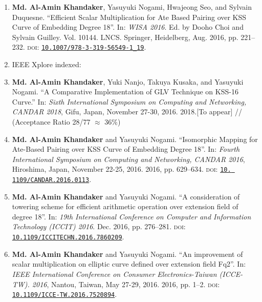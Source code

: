 \begin{enumerate}
	\item \textbf{Md. Al-Amin Khandaker}, Yasuyuki Nogami, Hwajeong Seo, and Sylvain Duquesne. ``Efficient Scalar Multiplication for Ate Based Pairing over KSS Curve of Embedding Degree 18''. In: \textit{WISA 2016}. Ed. by Dooho Choi and Sylvain Guilley. Vol. 10144. LNCS. Springer, Heidelberg, Aug. 2016, pp. 221–232. \textsc{doi}: \href{https://doi.org/10.1007/978-3-319-56549-1\_19}{\texttt{10.1007/978-3-319-56549-1\_19}}.

	\vspace{5mm}
	\clearpage
	\item[ ] \Large IEEE Xplore indexed:
	\normalsize
	\item \textbf{Md. Al-Amin Khandaker}, Yuki Nanjo, Takuya Kusaka, and Yasuyuki Nogami. ``A Comparative Implementation of GLV Technique on KSS-16 Curve.'' In:  \textit{Sixth International Symposium on Computing and Networking, CANDAR 2018}, Gifu, Japan, November 27-30, 2016. 2018.[To appear]
	// (Acceptance Ratio 28/77 $\approx$ 36\%)
	
	\item \textbf{Md. Al-Amin Khandaker} and Yasuyuki Nogami. “Isomorphic Mapping for Ate-Based Pairing over KSS Curve of Embedding Degree 18”. In: \textit{Fourth International Symposium on Computing and Networking, CANDAR 2016}, Hiroshima, Japan, November 22-25, 2016. 2016, pp. 629–634. \textsc{doi}: \href{https://doi.org/10. 1109/CANDAR.2016.0113}{\texttt{10. 1109/CANDAR.2016.0113}}.
	
	\item  \textbf{Md. Al-Amin Khandaker} and Yasuyuki Nogami. ``A consideration of towering scheme for efficient arithmetic operation over extension field of degree 18''. In: \textit{19th International Conference on Computer and Information Technology (ICCIT) 2016}. Dec. 2016, pp. 276–281. \textsc{doi}: \href{https://doi.org/10.1109/ICCITECHN.2016.7860209}{\texttt{10.1109/ICCITECHN.2016.7860209}}.
	
	\item \textbf{Md. Al-Amin Khandaker} and Yasuyuki Nogami. ``An improvement of scalar multiplication on elliptic curve defined over extension field Fq2''. In: \textit{IEEE International Conference on Consumer Electronics-Taiwan (ICCE- TW). 2016}, Nantou, Taiwan, May 27-29, 2016. 2016, pp. 1–2. \textsc{doi}: \href{https://doi.org/10.1109/ICCE-TW.2016.7520894}{\texttt{10.1109/ICCE-TW.2016.7520894}}.
	

\end{enumerate}
